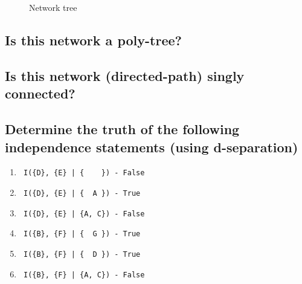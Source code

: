 \documentclass{article}                     %
\newcommand{\relation}[3][]
{
	\path [draw=blue, ->,#1] (#2) -- (#3);
}
\newcommand{\mynode}[3][]{
	\node [draw, circle] (#1) at (#2, #3) {#1};
}
\begin{document}
	\section{}
	\begin{figure}
		\centering
		\caption{Network tree}
		\label{fig:bn2}
	\end{figure}
	\subsection{Is this network a poly-tree?}
	\subsection{Is this network (directed-path) singly connected?}
	\subsection{Determine the truth of the following independence statements (using d-separation)}
	\begin{enumerate}		
		\item \begin{verbatim} I({D}, {E} | {    }) - False \end{verbatim}
		\item \begin{verbatim} I({D}, {E} | {  A }) - True \end{verbatim}
		\item \begin{verbatim} I({D}, {E} | {A, C}) - False \end{verbatim}
		\item \begin{verbatim} I({B}, {F} | {  G }) - True \end{verbatim}
		\item \begin{verbatim} I({B}, {F} | {  D }) - True \end{verbatim}
		\item \begin{verbatim} I({B}, {F} | {A, C}) - False \end{verbatim}

	\end{enumerate}
\end{document}

